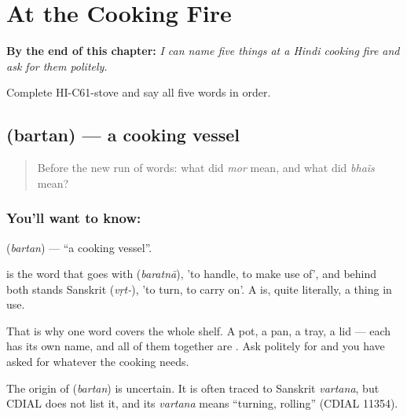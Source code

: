 
\chapter{At the Cooking Fire}
\label{ch:hi-at-the-cooking-fire}

\begin{chapteropening}
\textbf{By the end of this chapter:} \emph{I can name five things at a Hindi cooking fire and ask for them politely.}

Complete HI-C61-stove and say all five words in order.
\end{chapteropening}

\section[\texorpdfstring{\hi{बर्तन} (bartan)}{बर्तन (bartan)}]{ (bartan) — a cooking vessel}

\label{lesson:HI-C61-vessel}



\begin{quote}
Before the new run of words: what did \emph{mor} mean, and what did \emph{bhaĩs} mean?
\end{quote}

\subsection*{You'll want to know: }
\textbf{} (\emph{bartan}) — \textquotedblleft{}a cooking vessel\textquotedblright{}.

 is the word that goes with  (\emph{baratnā}), 'to handle, to make use of', and behind both stands Sanskrit  (\emph{vṛt-}), 'to turn, to carry on'. A  is, quite literally, a thing in use.

That is why one word covers the whole shelf. A pot, a pan, a tray, a lid — each has its own name, and all of them together are . Ask politely for  and you have asked for whatever the cooking needs.

\begin{cousinweb}
The origin of \textbf{} (\emph{bartan}) is uncertain. It is often traced to Sanskrit \emph{vartana}, but CDIAL does not list it, and its \emph{vartana} means \textquotedblleft{}turning, rolling\textquotedblright{} (CDIAL 11354).
\end{cousinweb}

